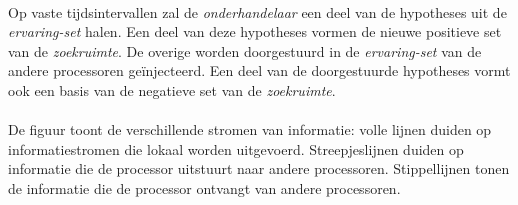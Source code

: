 \paragraph{}
Op vaste tijdsintervallen zal de \emph{onderhandelaar} een deel van de hypotheses uit de \emph{ervaring-set} halen. Een deel van deze hypotheses vormen de nieuwe positieve set van de \emph{zoekruimte}. De overige worden doorgestuurd in de \emph{ervaring-set} van de andere processoren ge\"injecteerd. Een deel van de doorgestuurde hypotheses vormt ook een basis van de negatieve set van de \emph{zoekruimte}.

\paragraph{}
De figuur toont de verschillende stromen van informatie: volle lijnen duiden op informatiestromen die lokaal worden uitgevoerd. Streepjeslijnen duiden op informatie die de processor uitstuurt naar andere processoren. Stippellijnen tonen de informatie die de processor ontvangt van andere processoren.